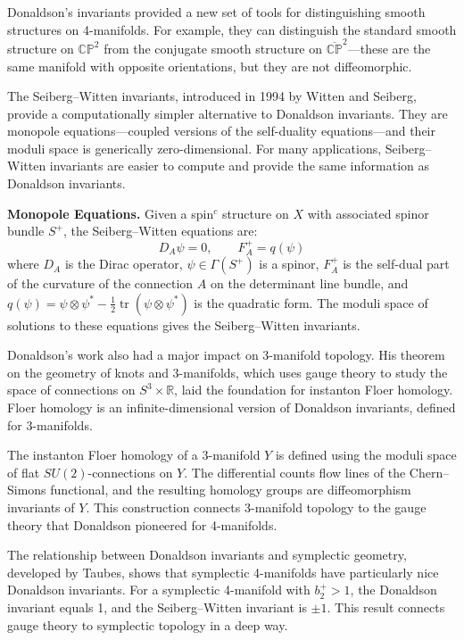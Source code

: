Donaldson's invariants provided a new set of tools for distinguishing smooth structures on 4-manifolds. For example, they can distinguish the standard smooth structure on $\mathbb{CP}^2$ from the conjugate smooth structure on $\overline{\mathbb{CP}}^2$---these are the same manifold with opposite orientations, but they are not diffeomorphic.

The Seiberg--Witten invariants, introduced in 1994 by Witten and Seiberg, provide a computationally simpler alternative to Donaldson invariants. They are monopole equations---coupled versions of the self-duality equations---and their moduli space is generically zero-dimensional. For many applications, Seiberg--Witten invariants are easier to compute and provide the same information as Donaldson invariants.

\textbf{Monopole Equations.} Given a spin$^c$ structure on $X$ with associated spinor bundle $S^+$, the Seiberg--Witten equations are:
\[
D_A \psi = 0, \qquad F_A^+ = q(\psi)
\]
where $D_A$ is the Dirac operator, $\psi \in \Gamma(S^+)$ is a spinor, $F_A^+$ is the self-dual part of the curvature of the connection $A$ on the determinant line bundle, and $q(\psi) = \psi \otimes \psi^* - \frac{1}{2}\operatorname{tr}(\psi \otimes \psi^*)$ is the quadratic form. The moduli space of solutions to these equations gives the Seiberg--Witten invariants.

Donaldson's work \cite{donaldson1983} also had a major impact on 3-manifold topology. His theorem on the geometry of knots and 3-manifolds, which uses gauge theory to study the space of connections on $S^3 \times \mathbb{R}$, laid the foundation for instanton Floer homology. Floer homology is an infinite-dimensional version of Donaldson invariants, defined for 3-manifolds.

The instanton Floer homology of a 3-manifold $Y$ is defined using the moduli space of flat $SU(2)$-connections on $Y$. The differential counts flow lines of the Chern--Simons functional, and the resulting homology groups are diffeomorphism invariants of $Y$. This construction connects 3-manifold topology to the gauge theory that Donaldson pioneered for 4-manifolds.

The relationship between Donaldson invariants and symplectic geometry, developed by Taubes, shows that symplectic 4-manifolds have particularly nice Donaldson invariants. For a symplectic 4-manifold with $b_2^+ > 1$, the Donaldson invariant equals 1, and the Seiberg--Witten invariant is $\pm 1$. This result connects gauge theory to symplectic topology in a deep way.

